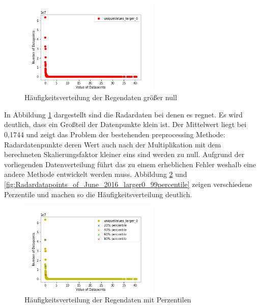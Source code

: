 \begin{figure}[H]
    \centering
    \includegraphics[width=0.6\textwidth,angle=0]{abb/Radardatapoints_of_June_2016_larger0}
    \caption[Datenaufbereitung]{Häufigkeitsverteilung der Regendaten größer null}
    \label{fig:Radardatapoints_of_June_2016_larger0}
\end{figure}

In Abbildung \ref{fig:Radardatapoints_of_June_2016_larger0} dargestellt sind die Radardaten bei denen es regnet. Es wird deutlich, dass ein Großteil der Datenpunkte klein ist. Der Mittelwert liegt bei 0,1744 und zeigt das Problem der bestehenden preprocessing Methode: Radardatenpunkte deren Wert auch nach der Multiplikation mit dem berechneten Skalierungsfaktor kleiner eins sind werden zu null. Aufgrund der vorliegenden Datenverteilung führt das zu einem erheblichen Fehler weshalb eine andere Methode entwickelt werden muss.
Abbildung \ref{fig:Radardatapoints_of_June_2016_larger0_percentiles} und \ref{fig:Radardatapoints_of_June_2016_larger0_99percentile} zeigen verschiedene Perzentile und machen so die Häufigkeitsverteilung deutlich.

\begin{figure}[H]
    \centering
    \includegraphics[width=0.6\textwidth,angle=0]{abb/Radardatapoints_of_June_2016_larger0_percentiles.png}
    \caption[Datenaufbereitung]{Häufigkeitsverteilung der Regendaten mit Perzentilen}
    \label{fig:Radardatapoints_of_June_2016_larger0_percentiles}
\end{figure}

